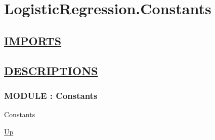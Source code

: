 \chapter*{LogisticRegression.Constants}
\hypertarget{ecldoc:toc:LogisticRegression.Constants}{}

\section*{\underline{IMPORTS}}

\section*{\underline{DESCRIPTIONS}}
\subsection*{MODULE : Constants}
\hypertarget{ecldoc:LogisticRegression.Constants}{}
\begin{minipage}[t]{\textwidth}
\begin{flushleft}
 Constants 
\end{flushleft}
\end{minipage}
\hyperlink{ecldoc:toc:LogisticRegression}{Up}


